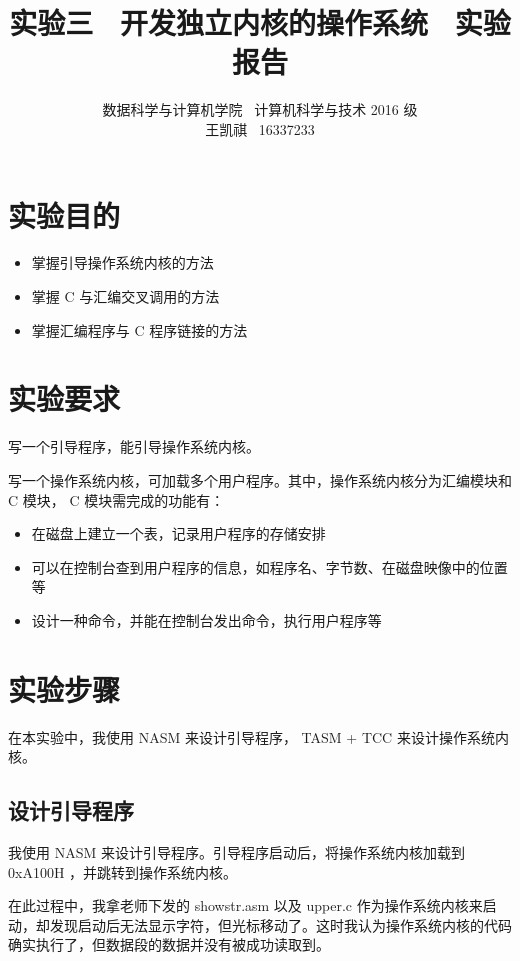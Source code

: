 \documentclass{article}
\begin{document}
\title{实验三 \ 开发独立内核的操作系统 \ 实验报告}
\author {数据科学与计算机学院 \ 计算机科学与技术 2016 级 \\ 王凯祺 \ 16337233}
\maketitle

\section{实验目的}

\begin{itemize}
\item 掌握引导操作系统内核的方法
\item 掌握 C 与汇编交叉调用的方法
\item 掌握汇编程序与 C 程序链接的方法
\end{itemize}

\section{实验要求}

写一个引导程序，能引导操作系统内核。

写一个操作系统内核，可加载多个用户程序。其中，操作系统内核分为汇编模块和 C 模块， C 模块需完成的功能有：

\begin{itemize}
\item 在磁盘上建立一个表，记录用户程序的存储安排
\item 可以在控制台查到用户程序的信息，如程序名、字节数、在磁盘映像中的位置等
\item 设计一种命令，并能在控制台发出命令，执行用户程序等
\end{itemize}

\section{实验步骤}

在本实验中，我使用 NASM 来设计引导程序， TASM + TCC 来设计操作系统内核。

\subsection{设计引导程序}

我使用 NASM 来设计引导程序。引导程序启动后，将操作系统内核加载到 0xA100H ，并跳转到操作系统内核。

在此过程中，我拿老师下发的 showstr.asm 以及 upper.c 作为操作系统内核来启动，却发现启动后无法显示字符，但光标移动了。这时我认为操作系统内核的代码确实执行了，但数据段的数据并没有被成功读取到。
\end{document}
